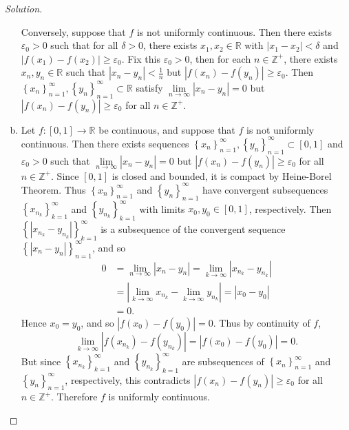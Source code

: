 \documentclass[12pt]{article}
\newcommand{\z}{\mathbb{Z}}
\newcommand{\real}{\mathbb{R}}
\newcommand\paren[1]{\left( #1 \right)}
\newcommand\setb[1]{\left \{ #1 \right \}}
\newcommand{\eps}{\varepsilon}
\theoremstyle{definition}
\begin{document}
\begin{proof}[Solution]
\begin{enumerate}[(a)]
        Conversely, suppose that $f$ is not uniformly continuous. Then there exists $\eps_0 > 0$ such that for all $\delta > 0$, there exists $x_1 , x_2 \in \real$ with $|x_1 - x_2| < \delta$ and $|f(x_1) - f(x_2)| \geq \eps_0$. Fix this $\eps_0 > 0$, then for each $n \in \z^+$, there exists $x_n , y_n \in \real$ such that $|x_n - y_n| < \frac{1}{n}$ but $|f(x_n) - f(y_n)| \geq \eps_0$. Then $\setb{ x_n }_{n=1}^{\infty}, \setb{y_n}_{n=1}^{\infty} \subset \real$ satisfy $\lim\limits_{n \to \infty} |x_n - y_n| = 0$ but $|f(x_n) - f(y_n)| \geq \eps_0$ for all $n \in \z^+$. 
        \item Let $f : [0,1] \to \real$ be continuous, and suppose that $f$ is not uniformly continuous. Then there exists sequences $\setb{ x_n }_{n=1}^{\infty} , \setb{ y_n }_{n=1}^{\infty} \subset [0,1]$ and $\eps_0 > 0$ such that $\lim\limits_{n \to \infty} |x_n - y_n| = 0$ but $|f(x_n) - f(y_n)| \geq \eps_0$ for all $n \in \z^+$. Since $[0,1]$ is closed and bounded, it is compact by Heine-Borel Theorem. Thus $\setb{ x_n }_{n=1}^{\infty}$ and $\setb{ y_n }_{n=1}^{\infty}$ have convergent subsequences $\setb{ x_{n_k} }_{k=1}^{\infty}$ and $\setb{ y_{n_k} }_{k=1}^{\infty}$ with limits $x_0 , y_0 \in [0,1]$, respectively. Then $\setb{ \left| x_{n_k} - y_{n_k} \right| }_{k=1}^{\infty}$ is a subsequence of the convergent sequence $\setb{ \left| x_n - y_n \right| }_{n=1}^{\infty}$, and so 
        \begin{align*}
            0 & = \lim\limits_{n \to \infty} |x_n - y_n| = \lim\limits_{k \to \infty} \left|x_{n_k} - y_{n_k} \right| \\
            & = \left| \lim\limits_{k \to \infty} x_{n_k} - \lim\limits_{k \to \infty} y_{n_k} \right| = |x_0 - y_0| \\
            & = 0.
        \end{align*}
        Hence $x_0 = y_0$, and so $|f(x_0) - f(y_0)| = 0$. Thus by continuity of $f$,
        \[
            \lim\limits_{k \to \infty} \left| f \paren{ x_{n_k} } - f \paren{ y_{n_k} } \right| = |f(x_0) - f(y_0)| = 0 . 
        \]
        But since $\setb{ x_{n_k} }_{k=1}^{\infty}$ and $\setb{ y_{n_k} }_{k=1}^{\infty}$ are subsequences of $\setb{ x_n }_{n=1}^{\infty}$ and $\setb{ y_n }_{n=1}^{\infty}$, respectively, this contradicts $|f(x_n) - f(y_n)| \geq \eps_0$ for all $n \in \z^+$. Therefore $f$ is uniformly continuous.
    \end{enumerate}
\end{proof}
\end{document}
